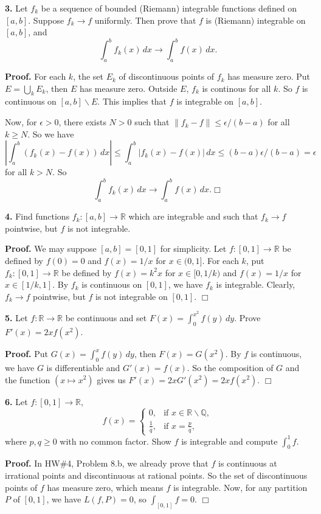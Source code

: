 \documentclass{article}
\begin{document}
    \textbf{3.} Let $f_k$ be a sequence of bounded (Riemann) integrable
functions defined on $[a,b]$. Suppose $f_k \to f$ uniformly. Then prove
that $f$ is (Riemann) integrable on $[a,b]$, and
\[\int_a^b f_k(x)\,dx \to \int_a^b f(x) \,dx.\]

    \textbf{Proof.} For each $k$, the set $E_k$ of discontinuous points of
$f_k$ has measure zero. Put $E = \bigcup_k E_k$, then $E$ has measure
zero. Outside $E$, $f_k$ is continous for all $k$. So $f$ is continuous
on $[a,b] \backslash E$. This implies that $f$ is integrable on $[a,b]$.

Now, for $\epsilon > 0$, there exists $N> 0$ such that
$\|f_k - f\| \le \epsilon/(b-a)$ for all $k\ge  N$. So we have
\[\left|\int_a^b (f_k(x) - f(x))\,dx\right| \le \int_a^b \left|f_k(x) - f(x)\right|\,dx \le (b-a) \epsilon /(b-a) = \epsilon\]
for all $k > N$. So \[\int_a^b f_k(x)\,dx \to \int_a^b f(x) \,dx. \Box\]

    \textbf{4.} Find functions $f_k :[a,b] \to \mathbb{R}$ which are
integrable and such that $f_k \to f$ pointwise, but $f$ is not
integrable.

    \textbf{Proof.} We may suppose $[a,b] = [0,1]$ for simplicity. Let
$f:[0,1]\to \mathbb{R}$ be defined by $f(0) = 0$ and $f(x) = 1/x$ for
$x\in (0,1]$. For each $k$, put $f_k:[0,1] \to \mathbb{R}$ be defined by
$f(x) = k^2x$ for $x\in [0,1/k)$ and $f(x) =1/x$ for $x\in [1/k,1]$. By
$f_k$ is continuous on $[0,1]$, we have $f_k$ is integrable. Clearly,
$f_k \to f$ pointwise, but $f$ is not integrable on $[0,1]$. $\Box$

    \textbf{5.} Let $f:\mathbb{R} \to \mathbb{R}$ be continuous and set
$F(x) = \int_0^{x^2} f(y)\, dy$. Prove $F'(x) = 2xf(x^2)$.

    \textbf{Proof.} Put $G(x) = \int_0^x f(y)\,dy$, then $F(x) = G(x^2)$. By
$f$ is continuous, we have $G$ is differentiable and $G'(x) = f(x)$. So
the composition of $G$ and the function $(x \mapsto x^2)$ gives us
$F'(x) = 2xG'(x^2) = 2xf(x^2)$. $\Box$

    \textbf{6.} Let $f:[0,1] \to \mathbb{R}$, \[f(x) = \begin{cases}
0, & \text{if } x\in \mathbb{R}\backslash \mathbb{Q},\\
\frac{1}{q}, & \text{if } x = \frac{p}{q},
\end{cases}\] where $p,q\ge 0$ with no common factor. Show $f$ is
integrable and compute $\int_0^1 f$.

    \textbf{Proof.} In HW\#4, Problem 8.b, we already prove that $f$ is
continuous at irrational points and discontinuous at rational points. So
the set of discontinuous points of $f$ has measure zero, which means $f$
is integrable. Now, for any partition $P$ of $[0,1]$, we have
$L(f,P) = 0$, so $\int_{[0,1]}f = 0$. $\Box$
\end{document}
